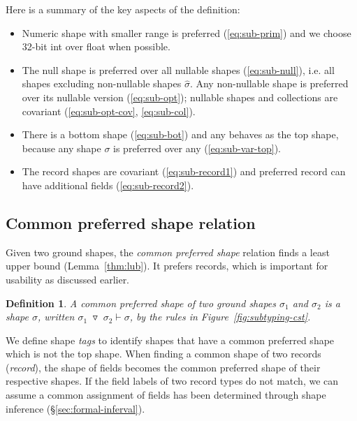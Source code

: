 \documentclass[10pt,preprint,blind,clearpagebib]{sigplanconf}
\newcommand{\kvd}[1]{\textnormal{\textcolor{kvdclr}{\sffamily #1}}}
\newcommand{\ident}[1]{\textnormal{\sffamily #1}}
\newcommand{\tsep}[0]{\; \triangledown \;}
\newtheorem{definition}{Definition}
\begin{document}


\noindent
Here is a summary of the key aspects of the definition:
\begin{itemize}
\item Numeric shape with smaller range is preferred (\ref{eq:sub-prim}) and we choose 32-bit 
\ident{int} over \ident{float} when possible.

\item The \kvd{null} shape is preferred over all nullable shapes (\ref{eq:sub-null}), i.e. 
  all shapes excluding non-nullable shapes $\hat{\sigma}$. Any non-nullable shape is preferred
  over its nullable version (\ref{eq:sub-opt}); nullable shapes and collections are 
  covariant (\ref{eq:sub-opt-cov}, \ref{eq:sub-col}).

\item There is a bottom shape (\ref{eq:sub-bot}) and \kvd{any} behaves as the top shape, because
  any shape $\sigma$ is preferred over \kvd{any} (\ref{eq:sub-var-top}). 

\item The record shapes are covariant (\ref{eq:sub-record1}) and preferred record can have 
  additional fields (\ref{eq:sub-record2}). 
\end{itemize}

\noindent


\subsection{Common preferred shape relation}
\label{sec:inference-commonsuper}

Given two ground shapes, the \emph{common preferred shape} relation finds a least upper bound
(Lemma~\ref{thm:lub}). It prefers records, which is important for usability as discussed
earlier.

\begin{definition}
A \emph{common preferred shape} of two ground shapes $\sigma_1$ and $\sigma_2$ is a shape $\sigma$, written 
$\sigma_1 \tsep \sigma_2 \vdash \sigma$, by the rules in 
Figure~\ref{fig:subtyping-cst}.
\end{definition}

\noindent
We define shape \emph{tags} to identify shapes that have a common preferred shape which is not the
top shape. When finding a common shape of two records (\emph{record}), the shape of fields becomes the common preferred shape of their 
respective shapes. If the field labels of two record types do not match,
we can assume a common assignment of fields has been determined
through shape inference (\S\ref{sec:formal-inferval}).
\end{document}
